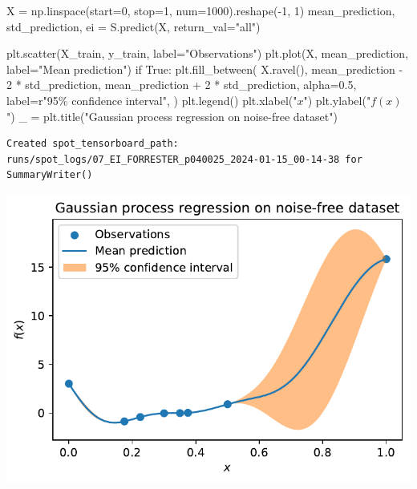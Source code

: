 \documentclass[
  letterpaper,
  DIV=11,
  numbers=noendperiod]{scrreprt}
\newenvironment{Shaded}{\begin{snugshade}}{\end{snugshade}}
\newcommand{\ControlFlowTok}[1]{\textcolor[rgb]{0.00,0.23,0.31}{#1}}
\newcommand{\DecValTok}[1]{\textcolor[rgb]{0.68,0.00,0.00}{#1}}
\newcommand{\FloatTok}[1]{\textcolor[rgb]{0.68,0.00,0.00}{#1}}
\newcommand{\NormalTok}[1]{\textcolor[rgb]{0.00,0.23,0.31}{#1}}
\newcommand{\OperatorTok}[1]{\textcolor[rgb]{0.37,0.37,0.37}{#1}}
\newcommand{\SpecialCharTok}[1]{\textcolor[rgb]{0.37,0.37,0.37}{#1}}
\newcommand{\StringTok}[1]{\textcolor[rgb]{0.13,0.47,0.30}{#1}}
\newcommand{\VariableTok}[1]{\textcolor[rgb]{0.07,0.07,0.07}{#1}}
\newcommand{\VerbatimStringTok}[1]{\textcolor[rgb]{0.13,0.47,0.30}{#1}}
\begin{document}
\begin{Shaded}
\begin{Highlighting}[]
\NormalTok{X }\OperatorTok{=}\NormalTok{ np.linspace(start}\OperatorTok{=}\DecValTok{0}\NormalTok{, stop}\OperatorTok{=}\DecValTok{1}\NormalTok{, num}\OperatorTok{=}\DecValTok{1000}\NormalTok{).reshape(}\OperatorTok{{-}}\DecValTok{1}\NormalTok{, }\DecValTok{1}\NormalTok{)}
\NormalTok{mean\_prediction, std\_prediction, ei }\OperatorTok{=}\NormalTok{ S.predict(X, return\_val}\OperatorTok{=}\StringTok{"all"}\NormalTok{)}

\NormalTok{plt.scatter(X\_train, y\_train, label}\OperatorTok{=}\StringTok{"Observations"}\NormalTok{)}
\NormalTok{plt.plot(X, mean\_prediction, label}\OperatorTok{=}\StringTok{"Mean prediction"}\NormalTok{)}
\ControlFlowTok{if} \VariableTok{True}\NormalTok{:}
\NormalTok{    plt.fill\_between(}
\NormalTok{        X.ravel(),}
\NormalTok{        mean\_prediction }\OperatorTok{{-}} \DecValTok{2} \OperatorTok{*}\NormalTok{ std\_prediction,}
\NormalTok{        mean\_prediction }\OperatorTok{+} \DecValTok{2} \OperatorTok{*}\NormalTok{ std\_prediction,}
\NormalTok{        alpha}\OperatorTok{=}\FloatTok{0.5}\NormalTok{,}
\NormalTok{        label}\OperatorTok{=}\VerbatimStringTok{r"95}\SpecialCharTok{\% c}\VerbatimStringTok{onfidence interval"}\NormalTok{,}
\NormalTok{    )}
\NormalTok{plt.legend()}
\NormalTok{plt.xlabel(}\StringTok{"$x$"}\NormalTok{)}
\NormalTok{plt.ylabel(}\StringTok{"$f(x)$"}\NormalTok{)}
\NormalTok{\_ }\OperatorTok{=}\NormalTok{ plt.title(}\StringTok{"Gaussian process regression on noise{-}free dataset"}\NormalTok{)}
\end{Highlighting}
\end{Shaded}

\begin{verbatim}
Created spot_tensorboard_path: runs/spot_logs/07_EI_FORRESTER_p040025_2024-01-15_00-14-38 for SummaryWriter()
\end{verbatim}

\includegraphics{012_num_spot_ei_files/figure-pdf/cell-47-output-2.pdf}
\end{document}
